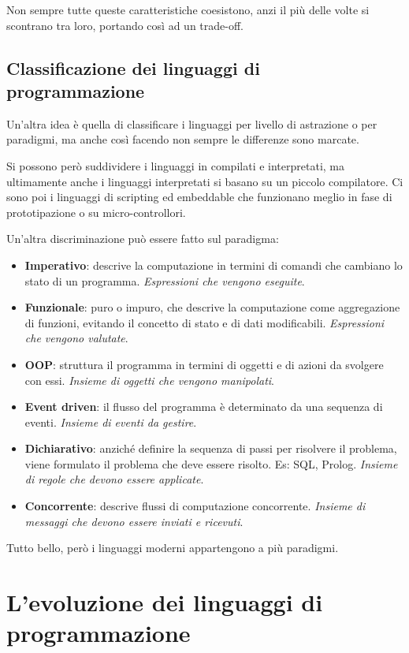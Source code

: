Non sempre tutte queste caratteristiche coesistono, anzi il più delle volte si scontrano tra loro, portando così ad un trade-off.

\subsection{Classificazione dei linguaggi di programmazione}

Un'altra idea è quella di classificare i linguaggi per livello di astrazione o per paradigmi, ma anche così facendo non sempre le differenze sono marcate.

Si possono però suddividere i linguaggi in compilati e interpretati, ma ultimamente anche i linguaggi interpretati si basano su un piccolo compilatore.
Ci sono poi i linguaggi di scripting ed embeddable che funzionano meglio in fase di prototipazione o su micro-controllori.

Un'altra discriminazione può essere fatto sul paradigma:

\begin{itemize}
	\item \textbf{Imperativo}: descrive la computazione in termini di comandi che cambiano lo stato di un programma. \textit{Espressioni che vengono eseguite}.
	\item \textbf{Funzionale}: puro o impuro, che descrive la computazione come aggregazione di funzioni, evitando il concetto di stato e di dati modificabili. \textit{Espressioni che vengono valutate}.
	\item \textbf{OOP}: struttura il programma in termini di oggetti e di azioni da svolgere con essi. \textit{Insieme di oggetti che vengono manipolati}.
	\item \textbf{Event driven}: il flusso del programma è determinato da una sequenza di eventi. \textit{Insieme di eventi da gestire}.
	\item \textbf{Dichiarativo}: anziché definire la sequenza di passi per risolvere il problema, viene formulato il problema che deve essere risolto. Es: SQL, Prolog. \textit{Insieme di regole che devono essere applicate}.
	\item \textbf{Concorrente}: descrive flussi di computazione concorrente. \textit{Insieme di messaggi che devono essere inviati e ricevuti}.
\end{itemize}

Tutto bello, però i linguaggi moderni appartengono a più paradigmi.

\section{L'evoluzione dei linguaggi di programmazione}

